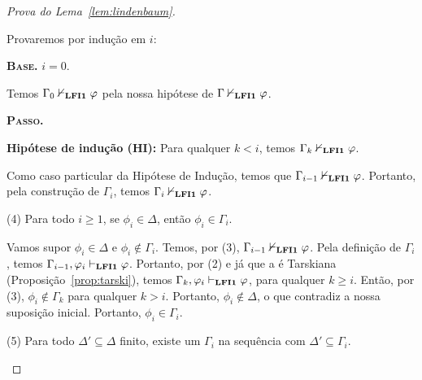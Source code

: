 \begin{proof}[Prova do Lema~\ref{lem:lindenbaum}]
\begin{adjustwidth}{1cm}{}
                Provaremos por indução em $i$:

                \begin{adjustwidth}{1cm}{}
                    \noindent\textbf{\textsc{Base.}} $i = 0$.
                    
                    \begin{adjustwidth}{1cm}{}
                        
                        Temos $\Gamma_0 \nvdash_{{\normalfont\textbf{LFI1}}{}} \varphi$ pela nossa hipótese de $\Gamma \nvdash_{{\normalfont\textbf{LFI1}}{}} \varphi$.
                        
                    \end{adjustwidth}
                    
                    \noindent\textbf{\textsc{Passo.}} 
                    
                    \noindent\textbf{Hipótese de indução (HI):} Para qualquer $k < i$, temos $\Gamma_k \nvdash_{{\normalfont\textbf{LFI1}}{}} \varphi$.
                    
                        Como caso particular da Hipótese de Indução, temos que $\Gamma_{i-1} \nvdash_{{\normalfont\textbf{LFI1}}{}} \varphi$. Portanto, pela construção de $\Gamma_i$, temos $\Gamma_i \nvdash_{{\normalfont\textbf{LFI1}}{}} \varphi$.
                        
                \end{adjustwidth}

                
                \noindent(4) Para todo $i \geq 1$, se $\phi_i \in \Delta$, então $\phi_i \in \Gamma_i$.

                \begin{adjustwidth}{1cm}{}


                    Vamos supor $\phi_i \in \Delta$ e $\phi_i \not \in \Gamma_i$. Temos, por (3), $\Gamma_{i - 1} \nvdash_{{\normalfont\textbf{LFI1}}{}} \varphi$. Pela definição de $\Gamma_i$, temos $\Gamma_{i - 1}, \varphi_i \vdash_{{\normalfont\textbf{LFI1}}{}} \varphi$. Portanto, por (2) e já que a \lfium{} é Tarskiana (Proposição~\ref{prop:tarski}), temos $\Gamma_k, \varphi_i \vdash_{{\normalfont\textbf{LFI1}}{}} \varphi$, para qualquer $k \geq i$. Então, por (3), $\phi_i \not \in \Gamma_k$ para qualquer $k > i$. Portanto, $\phi_i \not \in \Delta$, o que contradiz a nossa suposição inicial. Portanto, $\phi_i \in \Gamma_i$.

                \end{adjustwidth}

                \noindent(5) Para todo $\Delta' \subseteq \Delta$ finito, existe um $\Gamma_i$ na sequência com $\Delta' \subseteq \Gamma_i$.

                \begin{adjustwidth}{1cm}{}


\end{adjustwidth}
\end{adjustwidth}
\end{proof}
